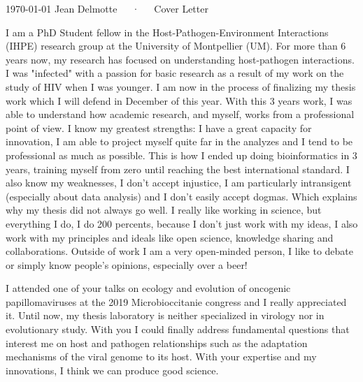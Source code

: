 \documentclass[11pt, a4paper]{awesome-cv}
\begin{document}
\makecvheader[R]

\makecvfooter
  {\today}
  {Jean Delmotte~~~·~~~Cover Letter}
  {\thepage}
\makelettertitle

\begin{cvletter}


I am a PhD Student fellow in the Host-Pathogen-Environment Interactions (IHPE) research group at the University of Montpellier (UM). For more than 6 years now, my research has focused on understanding host-pathogen interactions. I was "infected" with a passion for basic research as a result of my work on the study of HIV when I was younger. I am now in the process of finalizing my thesis work which I will defend in December of this year. With this 3 years work, I was able to understand how academic research, and myself, works from a professional point of view. I know my greatest strengths: I have a great capacity for innovation, I am able to project myself quite far in the analyzes and I tend to be professional as much as possible. This is how I ended up doing bioinformatics in 3 years, training myself from zero until reaching the best international standard. I also know my weaknesses, I don't accept injustice, I am particularly intransigent (especially about data analysis) and I don't easily accept dogmas. Which explains why my thesis did not always go well. I really like working in science, but everything I do, I do 200 percents, because I don't just work with my ideas, I also work with my principles and ideals like open science, knowledge sharing and collaborations. Outside of work I am a very open-minded person, I like to debate or simply know people's opinions, especially over a beer!

I attended one of your talks on ecology and evolution of oncogenic papillomaviruses at the 2019 Microbioccitanie congress and I really appreciated it. Until now, my thesis laboratory is neither specialized in virology nor in evolutionary study. With you I could finally address fundamental questions that interest me on host and pathogen relationships such as the adaptation mechanisms of the viral genome to its host. With your expertise and my innovations, I think we can produce good science.


\end{cvletter}
\end{document}
